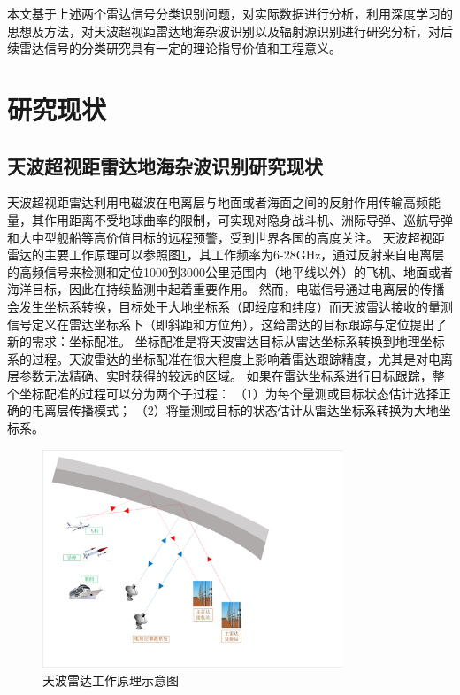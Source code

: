 本文基于上述两个雷达信号分类识别问题，对实际数据进行分析，利用深度学习的思想及方法，对天波超视距雷达地海杂波识别以及辐射源识别进行研究分析，对后续雷达信号的分类研究具有一定的理论指导价值和工程意义。

\section{研究现状}
\subsection{天波超视距雷达地海杂波识别研究现状}
天波超视距雷达利用电磁波在电离层与地面或者海面之间的反射作用传输高频能量，其作用距离不受地球曲率的限制，可实现对隐身战斗机、洲际导弹、巡航导弹和大中型舰船等高价值目标的远程预警，受到世界各国的高度关注。
天波超视距雷达的主要工作原理可以参照图\ref{fig:othr_how}，其工作频率为6-28GHz，通过反射来自电离层的高频信号来检测和定位1000到3000公里范围内（地平线以外）的飞机、地面或者海洋目标，因此在持续监测中起着重要作用。
然而，电磁信号通过电离层的传播会发生坐标系转换，目标处于大地坐标系（即经度和纬度）而天波雷达接收的量测信号定义在雷达坐标系下（即斜距和方位角），这给雷达的目标跟踪与定位提出了新的需求：坐标配准。
坐标配准是将天波雷达目标从雷达坐标系转换到地理坐标系的过程。天波雷达的坐标配准在很大程度上影响着雷达跟踪精度，尤其是对电离层参数无法精确、实时获得的较远的区域。
如果在雷达坐标系进行目标跟踪，整个坐标配准的过程可以分为两个子过程：
（1）为每个量测或目标状态估计选择正确的电离层传播模式；
（2）将量测或目标的状态估计从雷达坐标系转换为大地坐标系。
\begin{figure}[hbt]
	\centering
	\includegraphics[width=9cm]{figures/introduction/othr_work_new}
	\caption{天波雷达工作原理示意图}
	\label{fig:othr_how}
\end{figure}

